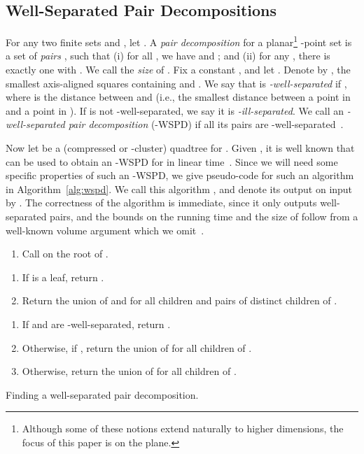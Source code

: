 \documentclass[11pt]{paper}
\begin{document}
 \subsection {Well-Separated Pair Decompositions}

    For any two finite sets  and , let
    .
    A \emph {pair decomposition}
     for a planar\footnote
    {Although some of these notions extend naturally to higher dimensions,
    the focus of this paper is on the plane.}
    -point set  is a set of  \emph {pairs}
      , such
    that
    (i) for all , we have  and
       ; and
    (ii) for any , there is exactly one  with
      .
    We call  the \emph{size} of .
    Fix a constant , and let .
    Denote by ,  the smallest axis-aligned squares containing
     and . We say that 
    is \emph{-well-separated} if ,
    where  is the distance between  and  (i.e.,
    the smallest distance
    between a point in  and a point in ).
    If  is not -well-separated, we say it is
    \emph{-ill-separated}.
    We call  an
    \emph {-well-separated pair decomposition} (-WSPD)
    if all its pairs are
    -well-separated~\cite{CallahanKo93,CallahanKo95,Eppstein00,HarPeled11}.



    Now let   be a (compressed or -cluster) quadtree for .
    Given , it is well known that  can be used to
    obtain an -WSPD for  in linear time~\cite{CallahanKo95,HarPeled11}.
    Since we will need some specific properties of such an -WSPD,
    we give pseudo-code for such an  algorithm 
    in Algorithm~\ref{alg:wspd}. We call this algorithm
    , and denote its output on input  by .
    The correctness of the algorithm  is immediate,
    since it only outputs well-separated pairs, and the bounds on the
    running time and the size of  follow from a well-known
    volume argument which we
    omit~\cite{BuchinLoMoMuXX,CallahanKo95,Chan08,HarPeled11}.
   \begin{algorithm}[ht]
    \begin{enumerate}
    \item Call  on the root  of .
    \end{enumerate}
    
    \begin{enumerate}
    \item If  is a leaf, return .
    \item Return the union of  and
       for all children  and
      pairs of distinct children  of .
    \end{enumerate}
    \vskip0.2cm
    \noindent
    
    \begin{enumerate}
    \item If  and  are
    -well-separated, return .
    \item Otherwise, if , return
       the union of  for all children  of .
    \item  Otherwise, return the union of  for all
       children  of .
    \end{enumerate}
    \caption{Finding a well-separated pair decomposition.}
    \label{alg:wspd}
    \end{algorithm}
\end{document}
